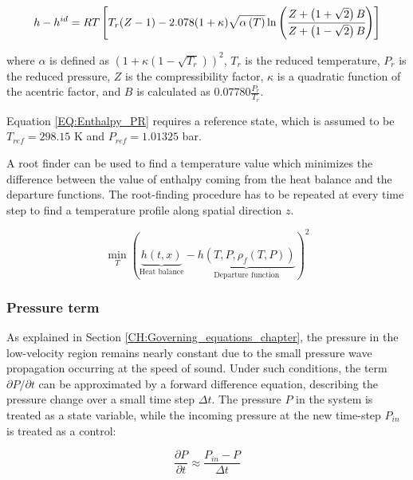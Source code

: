 \documentclass[a4paper,fleqn]{cas-dc}
\begin{document}
	{\scriptsize
		\begin{equation}
			h-h^{id}=RT \left[T_r(Z-1) -2.078(1+\kappa ){\sqrt { \alpha\left(T\right) } } \ln \left(\cfrac{Z+\left( 1+\sqrt{2} \right)B}{Z+\left( 1-\sqrt{2} \right)B}\right)\right]
			\label{EQ:Enthalpy_PR}
		\end{equation}				
	}
	
	where $\alpha$ is defined as $\left( 1+\kappa \left( 1 - \sqrt{T_r} \right) \right)^2$, $T_r$ is the reduced temperature, $P_r$ is the reduced pressure, $Z$ is the compressibility factor, $\kappa$ is a quadratic function of the acentric factor, and $B$ is calculated as $0.07780\frac{P_r}{T_r}$.
	
	Equation \ref{EQ:Enthalpy_PR} requires a reference state, which is assumed to be $T_{ref}=298.15$ K and $P_{ref}=1.01325$ bar.
	
	A root finder can be used to find a temperature value which minimizes the difference between the value of enthalpy coming from the heat balance and the departure functions. The root-finding procedure has to be repeated at every time step to find a temperature profile along spatial direction $z$.
	
	{\footnotesize
		\begin{equation}
			\min_T \left( \underbrace{h\left(t,x\right)}_{\text{Heat balance}} - \underbrace{h\left(T,P,\rho_f\left(T,P\right)\right)}_{\text{Departure function}} \right)^2
			\label{EQ:Enthalpy_root}
		\end{equation}
	}
	
	\subsubsection{Pressure term} \label{CH: Pressure}
	
	As explained in Section \ref{CH:Governing_equations_chapter}, the pressure in the low-velocity region remains nearly constant due to the small pressure wave propagation occurring at the speed of sound. Under such conditions, the term $\partial P/\partial t$ can be approximated by a forward difference equation, describing the pressure change over a small time step $\Delta t$. The pressure $P$ in the system is treated as a state variable, while the incoming pressure at the new time-step $P_{in}$ is treated as a control:
	
	{\footnotesize
		\begin{equation}
			\frac{\partial P}{\partial t} \approx \frac{P_{in} - P }{\Delta t}
	\end{equation}}
	
\end{document}
